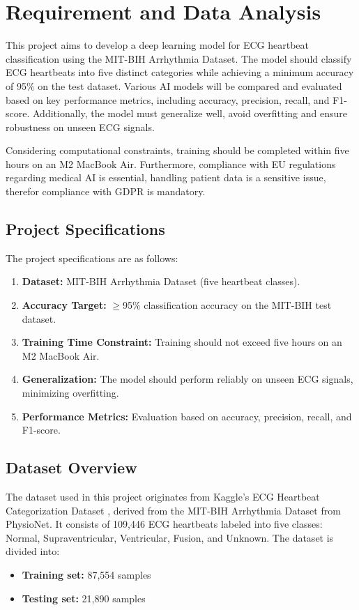 \section{Requirement and Data Analysis}
This project aims to develop a deep learning model for ECG heartbeat classification using the MIT-BIH Arrhythmia Dataset. The model should classify ECG heartbeats into five distinct categories while achieving a minimum accuracy of 95\% on the test dataset. Various AI models will be compared and evaluated based on key performance metrics, including accuracy, precision, recall, and F1-score. Additionally, the model must generalize well, avoid overfitting and ensure robustness on unseen ECG signals.

Considering computational constraints, training should be completed within five hours on an M2 MacBook Air. Furthermore, compliance with EU regulations regarding medical AI is essential, handling patient data is a sensitive issue, therefor compliance with GDPR is mandatory.

\subsection{Project Specifications}\label{sec:project-specs}
The project specifications are as follows:
\begin{enumerate}
    \item \textbf{Dataset:} MIT-BIH Arrhythmia Dataset (five heartbeat classes).
    \item \textbf{Accuracy Target:} $\geq$95\% classification accuracy on the MIT-BIH test dataset.
    \item \textbf{Training Time Constraint:} Training should not exceed five hours on an M2 MacBook Air.
    \item \textbf{Generalization:} The model should perform reliably on unseen ECG signals, minimizing overfitting.
    \item \textbf{Performance Metrics:} Evaluation based on accuracy, precision, recall, and F1-score.
\end{enumerate}

\subsection{Dataset Overview}
The dataset used in this project originates from Kaggle's ECG Heartbeat Categorization Dataset \cite{b1}, derived from the MIT-BIH Arrhythmia Dataset from PhysioNet. It consists of 109,446 ECG heartbeats labeled into five classes: Normal, Supraventricular, Ventricular, Fusion, and Unknown. The dataset is divided into:
\begin{itemize}
    \item \textbf{Training set:} 87,554 samples
    \item \textbf{Testing set:} 21,890 samples
\end{itemize}

